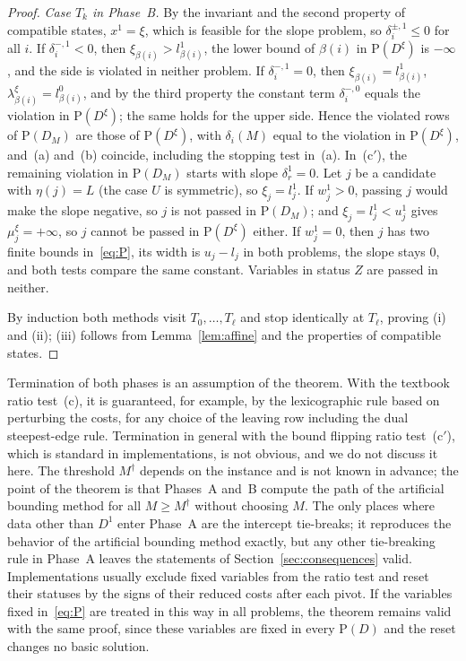 \documentclass[11pt,a4paper]{article}
\theoremstyle{plain}
\theoremstyle{definition}
\theoremstyle{remark}
\newcommand{\Pb}{\mathrm{P}}
\begin{document}
\begin{proof}
\emph{Case $T_k$ in Phase~B.} By the invariant and the second property of compatible states, $x^1=\xi$, which is feasible for the slope problem, so $\delta^{\pm,1}_i\le0$ for all $i$. If $\delta^{-,1}_i<0$, then $\xi_{\beta(i)}>l^1_{\beta(i)}$, the lower bound of $\beta(i)$ in $\Pb(D^\xi)$ is $-\infty$, and the side is violated in neither problem. If $\delta^{-,1}_i=0$, then $\xi_{\beta(i)}=l^1_{\beta(i)}$, $\lambda^\xi_{\beta(i)}=l^0_{\beta(i)}$, and by the third property the constant term $\delta^{-,0}_i$ equals the violation in $\Pb(D^\xi)$; the same holds for the upper side. Hence the violated rows of $\Pb(D_M)$ are those of $\Pb(D^\xi)$, with $\delta_i(M)$ equal to the violation in $\Pb(D^\xi)$, and~(a) and~(b) coincide, including the stopping test in~(a). In~(c$'$), the remaining violation in $\Pb(D_M)$ starts with slope $\delta^1_r=0$. Let $j$ be a candidate with $\eta(j)=L$ (the case $U$ is symmetric), so $\xi_j=l^1_j$. If $w^1_j>0$, passing $j$ would make the slope negative, so $j$ is not passed in $\Pb(D_M)$; and $\xi_j=l^1_j<u^1_j$ gives $\mu^\xi_j=+\infty$, so $j$ cannot be passed in $\Pb(D^\xi)$ either. If $w^1_j=0$, then $j$ has two finite bounds in~\eqref{eq:P}, its width is $u_j-l_j$ in both problems, the slope stays $0$, and both tests compare the same constant. Variables in status $Z$ are passed in neither.

By induction both methods visit $T_0,\dots,T_\ell$ and stop identically at $T_\ell$, proving (i) and (ii); (iii) follows from Lemma~\ref{lem:affine} and the properties of compatible states.
\end{proof}

Termination of both phases is an assumption of the theorem. With the textbook ratio test~(c), it is guaranteed, for example, by the lexicographic rule based on perturbing the costs, for any choice of the leaving row including the dual steepest-edge rule. Termination in general with the bound flipping ratio test~(c$'$), which is standard in implementations, is not obvious, and we do not discuss it here. The threshold $M^\dagger$ depends on the instance and is not known in advance; the point of the theorem is that Phases~A and~B compute the path of the artificial bounding method for all $M\ge M^\dagger$ without choosing $M$. The only places where data other than $D^1$ enter Phase~A are the intercept tie-breaks; it reproduces the behavior of the artificial bounding method exactly, but any other tie-breaking rule in Phase~A leaves the statements of Section~\ref{sec:consequences} valid. Implementations usually exclude fixed variables from the ratio test and reset their statuses by the signs of their reduced costs after each pivot. If the variables fixed in~\eqref{eq:P} are treated in this way in all problems, the theorem remains valid with the same proof, since these variables are fixed in every $\Pb(D)$ and the reset changes no basic solution.
\end{document}
